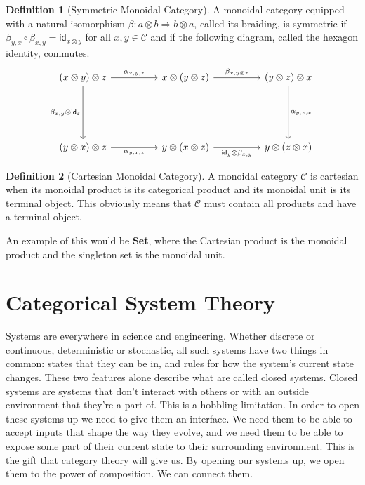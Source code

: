 \documentclass[12pt]{article}
\theoremstyle{definition}
\newtheorem{definition}{Definition}
\begin{document}
\begin{definition}[Symmetric Monoidal Category]
    A monoidal category equipped with a natural isomorphism $\beta:a\otimes b\Rightarrow b\otimes a$, called its braiding, is symmetric if $\beta_{y,x}\circ\beta_{x,y}=\mathsf{id}_{x\otimes y}$ for all $x,y\in\mathcal{C}$
    and if the following diagram, called the hexagon identity, commutes.
    \[\begin{tikzcd}
            {(x\otimes y)\otimes z} && {x \otimes (y \otimes z)} && {(y\otimes z)\otimes x} \\
            \\
            \\
            {(y\otimes x)\otimes z} && {y\otimes (x\otimes z)} && {y\otimes (z\otimes x)}
            \arrow["{\alpha_{x,y,z}}", from=1-1, to=1-3]
            \arrow["{\beta_{x,y\otimes z}}", from=1-3, to=1-5]
            \arrow["{\alpha_{y,z,x}}", from=1-5, to=4-5]
            \arrow["{\beta_{x,y}\otimes \mathsf{id}_z}"', from=1-1, to=4-1]
            \arrow["{\alpha_{y,x,z}}"', from=4-1, to=4-3]
            \arrow["{\mathsf{id}_y \otimes \beta_{x,y}}"', from=4-3, to=4-5]
        \end{tikzcd}\]
\end{definition}

\begin{definition}[Cartesian Monoidal Category]
    A monoidal category $\mathcal{C}$ is cartesian when its monoidal product is its categorical product and its monoidal unit is its terminal object.
    This obviously means that $\mathcal{C}$ must contain all products and have a terminal object.
\end{definition}
An example of this would be \textbf{Set}, where the Cartesian product is the monoidal product and the singleton set is the monoidal unit.






\pagebreak
\section*{Categorical System Theory}
Systems are everywhere in science and engineering.
Whether discrete or continuous, deterministic or stochastic, all such systems have two things in common: states that they can be in, and rules for how the system's current state changes.
These two features alone describe what are called closed systems.
Closed systems are systems that don't interact with others or with an outside environment that they're a part of.
This is a hobbling limitation.
In order to open these systems up we need to give them an interface.
We need them to be able to accept inputs that shape the way they evolve, and we need them to be able to expose some part of their current state to their surrounding environment.
This is the gift that category theory will give us.
By opening our systems up, we open them to the power of composition.
We can connect them.
\end{document}
